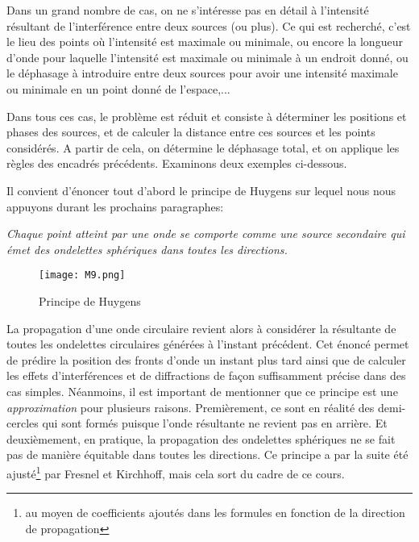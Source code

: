 Dans un grand nombre de cas, on ne s'intéresse pas en détail à l'intensité résultant de l'interférence entre deux sources (ou plus). Ce qui est recherché, c'est le lieu des points où l'intensité est maximale ou minimale, ou encore la longueur d'onde pour laquelle l'intensité est maximale ou minimale à un endroit donné, ou le déphasage à introduire entre deux sources pour avoir une intensité maximale ou minimale en un point donné de l'espace,...

Dans tous ces cas, le problème est réduit et consiste à déterminer les positions et phases des sources, et de calculer la distance entre ces sources et les points considérés. A partir de cela, on détermine le déphasage total, et on applique les règles des encadrés précédents. Examinons deux exemples ci-dessous.

Il convient d'énoncer tout d'abord le principe de Huygens sur lequel nous nous appuyons durant les prochains paragraphes:
\begin{center}
\textit{Chaque point atteint par une onde se comporte comme une source secondaire qui émet des ondelettes sphériques dans toutes les directions.}
\end{center}

\begin{figure}[htb]
\centering
\texttt{[image: M9.png]}
\caption{Principe de Huygens}
\end{figure}

La propagation d'une onde circulaire revient alors à considérer la résultante de toutes les ondelettes circulaires générées à l'instant précédent.
Cet énoncé permet de prédire la position des fronts d’onde un instant plus tard ainsi que de calculer les effets d’interférences et de diffractions de façon suffisamment précise dans des cas simples.
Néanmoins, il est important de mentionner que ce principe est une {\it approximation} pour plusieurs raisons. Premièrement, ce sont en réalité des demi-cercles qui sont formés puisque l'onde résultante ne revient pas en arrière. Et deuxièmement, en pratique, la propagation des ondelettes sphériques ne se fait pas de manière équitable dans toutes les directions. Ce principe a par la suite été ajusté\footnote{au moyen de coefficients ajoutés dans les formules en fonction de la direction de propagation} par Fresnel et Kirchhoff, mais cela sort du cadre de ce cours.

